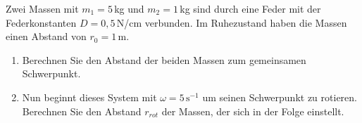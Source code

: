 \begin{ExerciseBlock}
Zwei Massen mit $m_1 = 5\,$kg und $m_2 = 1\,$kg sind durch eine Feder mit der Federkonstanten $D=0,5\,$N/cm verbunden.
Im Ruhezustand haben die Massen einen Abstand von $r_0 = 1\,$m. \\

\begin{center}
\end{center}

\begin{enumerate}
	\item Berechnen Sie den Abstand der beiden Massen zum gemeinsamen Schwerpunkt.

	\item Nun beginnt dieses System mit $\omega = 5 \, \text{s}^{-1}$ um seinen Schwerpunkt zu rotieren. Berechnen Sie den Abstand $r_{rot}$ der Massen, der sich in der Folge einstellt.

\end{enumerate}
\end{ExerciseBlock}
